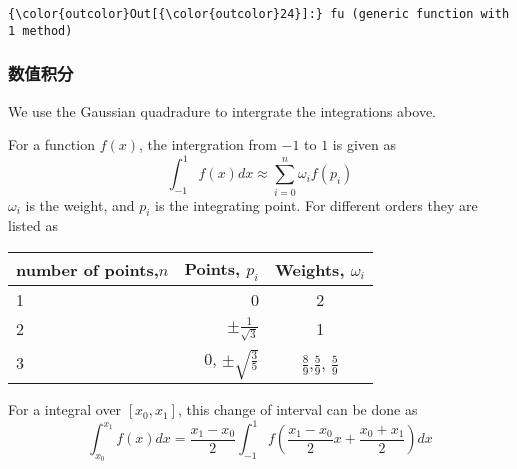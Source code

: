\documentclass[11pt]{article}
\begin{document}
\begin{Verbatim}[commandchars=\\\{\}]
{\color{outcolor}Out[{\color{outcolor}24}]:} fu (generic function with 1 method)
\end{Verbatim}
            
    \subsubsection{数值积分}\label{ux6570ux503cux79efux5206}

We use the Gaussian quadradure to intergrate the integrations above.

For a function \(f(x)\), the intergration from \(-1\) to \(1\) is given
as \[ 
  \int_{-1}^1 f(x)dx \approx \sum_{i=0}^n \omega_i f(p_i)
\] \(\omega_i\) is the weight, and \(p_i\) is the integrating point. For
different orders they are listed as

\begin{longtable}[c]{@{}lrc@{}}
\toprule
number of points,\(n\) & Points, \(p_i\) & Weights,
\(\omega_i\)\tabularnewline
\midrule
\endhead
1 & 0 & 2\tabularnewline
2 & \(\pm \frac{1}{\sqrt{3}}\) & 1\tabularnewline
3 & 0, \(\pm \sqrt{\frac{3}{5}}\) & \(\frac{8}{9}\),\(\frac{5}{9}\),
\(\frac{5}{9}\)\tabularnewline
\bottomrule
\end{longtable}

For a integral over \([x_0,x_1]\), this change of interval can be done
as
\[ \int_{x_0}^{x_1}f(x) dx= \frac{x_1-x_0}{2}\int_{-1}^{1} f(\frac{x_1-x_0}{2}x+\frac{x_0+x_1}{2})dx
 \]
\end{document}
